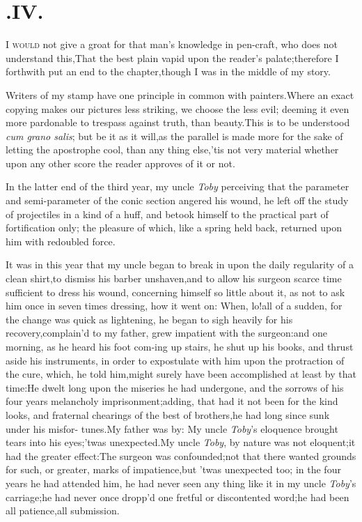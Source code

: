 \documentclass{article}
\begin{document}
\section{.\enspace  IV.}

\lettrine{I}{ would} not give a groat for that
man’s knowledge in pen-craft, who does not\break 
understand this,\tsk That the best plain
vapid upon the reader’s palate;\tsk there\-fore I forthwith put an end to the
chapter,\tsk though I was in the middle of my story.

\tsh Writers of my stamp have one principle in common
with painters.\tsk\break Where an exact copying makes our pictures less
striking, we choose the less evil; deeming it even more pardonable
to trespass against truth, than beauty.\tsk\break This is to be understood
\textit{cum grano salis}; but be it as it will,\tsk as the parallel
is made more for the sake of letting the apostrophe cool, than any
thing else,\tsk\break ’tis not very material whether upon any
other score the reader approves of it or not.

In the latter end of the third year, my uncle \textit{Toby}
perceiving that the parameter and semi-parameter of the conic
section angered his wound, he left off the study of projectiles in
a kind of a huff, and betook himself to the practical part of
fortification only; the pleasure of which, like a spring held back,
returned upon him with redoubled force.

It was in this year that my uncle began to break in upon the daily regularity of a clean
shirt,\tsh to dismiss his barber
unshaven,\tsh and to allow his surgeon
scarce time
sufficient to dress his wound, concerning himself so little about
it, as not to ask him once in seven times dressing, how it went on:
When, lo!\tsk all of a sudden, for the change was quick as
lightening, he began to sigh heavily for his
recovery,\tsk complain’d to my father, grew impatient with
the surgeon:\tsk and one morning, as he heard his foot
com-\break ing up stairs, he shut up his books, and thrust aside his
instruments, in order to expostulate with him upon the protraction
of the cure, which, he told him,\break might surely have been
accomplished at least by that time:\tsk He dwelt long upon the
miseries he had undergone, and the sorrows of his four years
melancholy\break
imprisonment;\tsk adding, that had it not been
for the kind looks, and fraternal chearings of the best of
brothers,\tsk he had long since sunk under his
misfor- tunes.\tsk My father was by: My uncle
\textit{Toby}’s eloquence brought tears into his eyes;\tsh ’twas
unexpected.\tsh My uncle \textit{Toby}, by nature was not
eloquent;\tsk\break it had the greater effect:\tsk The surgeon
was confounded;\tsk not that there wanted grounds for
such, or greater, marks of impatience,\tsk but ’twas
unexpected too; in the four years he had attended him, he had never
seen any thing like it in my uncle \textit{Toby}’s carriage;\tsk he
had never once dropp’d one fretful or discontented
word;\tsk he had been all patience,\tsk all
submission.
\end{document}

